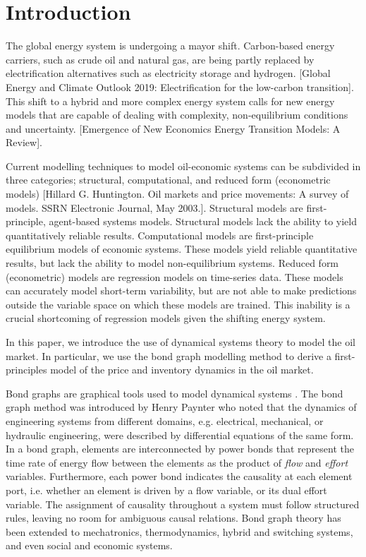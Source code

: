 \section{Introduction}
\label{sec: intro}




The global energy system is undergoing a mayor shift. Carbon-based energy carriers, such as crude oil and natural gas, are being partly replaced by electrification alternatives such as electricity storage and hydrogen. [Global Energy and Climate Outlook 2019: Electrification for the low-carbon transition]. 
This shift to a hybrid and more complex energy system calls for new energy models that are capable of dealing with complexity, non-equilibrium conditions and uncertainty. [Emergence of New Economics Energy Transition Models: A Review].

 
Current modelling techniques to model oil-economic systems can be subdivided in three categories; structural, computational, and reduced form (econometric models) [Hillard G. Huntington. Oil markets and price movements: A survey of models. SSRN Electronic Journal, May 2003.]. Structural models are first-principle, agent-based systems models. Structural models lack the ability to yield quantitatively reliable results. 
Computational models are first-principle equilibrium models of economic systems.
These models yield reliable quantitative results, but lack the ability to model non-equilibrium systems. 
Reduced form (econometric) models are regression models on time-series data.
These models can accurately model short-term variability, but are not able to make predictions outside the variable space on which these models are trained.
This inability is a crucial shortcoming of regression models given the shifting energy system.

In this paper, we introduce the use of dynamical systems theory to model the oil market.
In particular, we use the bond graph modelling method to derive a first-principles model of the price and inventory dynamics in the oil market.



Bond graphs are graphical tools used to model dynamical systems \cite{Karnopp2012}.
The bond graph method was introduced by Henry Paynter who noted that the dynamics of engineering systems from different domains, e.g. electrical, mechanical, or hydraulic engineering, were described by differential equations of the same form.
In a bond graph, elements are interconnected by power bonds that represent the time rate of energy flow between the elements as the product of \textit{flow} and \textit{effort} variables.
Furthermore, each power bond indicates the causality at each element port, i.e. whether an element is driven by a {flow} variable, or its dual {effort} variable. 
The assignment of causality throughout a system must follow structured rules, leaving no room for ambiguous causal relations.
Bond graph theory has been extended to mechatronics, thermodynamics, hybrid and switching systems, and even social and economic systems.


